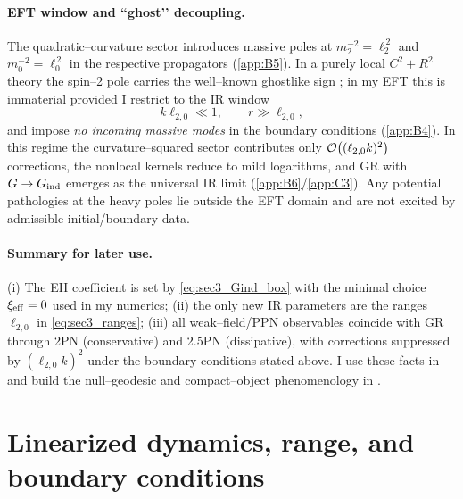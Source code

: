 \documentclass{iopjournal}
\begin{document}
\paragraph{EFT window and ``ghost’’ decoupling.}
The quadratic–curvature sector introduces massive poles at $m_2^{-2}=\ell_2^{\,2}$ and $m_0^{-2}=\ell_0^{\,2}$ in the respective propagators (\cref{app:B5}). In a purely local $C^2+R^2$ theory the spin–2 pole carries the well–known ghostlike sign \cite{Stelle1977}; in my EFT this is immaterial provided I restrict to the IR window
\begin{equation}
k\ell_{2,0}\ll1,\qquad r\gg \ell_{2,0},
\label{eq:sec3_IRwindow}
\end{equation}
and impose \emph{no incoming massive modes} in the boundary conditions (\cref{app:B4}). In this regime the curvature–squared sector contributes only $\order{(\ell_{2,0}k)^2}$ corrections, the nonlocal kernels reduce to mild logarithms, and GR with $G\to G_{\rm ind}$ emerges as the universal IR limit (\cref{app:B6}/\cref{app:C3}). Any potential pathologies at the heavy poles lie outside the EFT domain and are not excited by admissible initial/boundary data.

\paragraph{Summary for later use.}
(i) The EH coefficient is set by \eqref{eq:sec3_Gind_box} with the minimal choice $\xi_{\rm eff}=0$ used in my numerics; (ii) the only new IR parameters are the ranges $\ell_{2,0}$ in \eqref{eq:sec3_ranges}; (iii) all weak–field/PPN observables coincide with GR through 2PN (conservative) and 2.5PN (dissipative), with corrections suppressed by $(\ell_{2,0}k)^2$ under the boundary conditions stated above. I use these facts in  and build the null–geodesic and compact–object phenomenology in .

\section{Linearized dynamics, range, and boundary conditions}\label{sec:linear}
\end{document}
